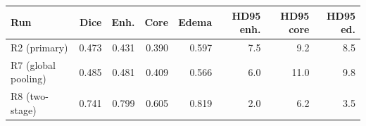 \begin{tabular}{lrrrrrrr}
\toprule
Run & Dice & Enh. & Core & Edema & HD95 enh. & HD95 core & HD95 ed. \\
\midrule
R2 (primary) & 0.473 & 0.431 & 0.390 & 0.597 & 7.5 & 9.2 & 8.5 \\
R7 (global pooling) & 0.485 & 0.481 & 0.409 & 0.566 & 6.0 & 11.0 & 9.8 \\
R8 (two-stage) & 0.741 & 0.799 & 0.605 & 0.819 & 2.0 & 6.2 & 3.5 \\
\bottomrule
\end{tabular}
